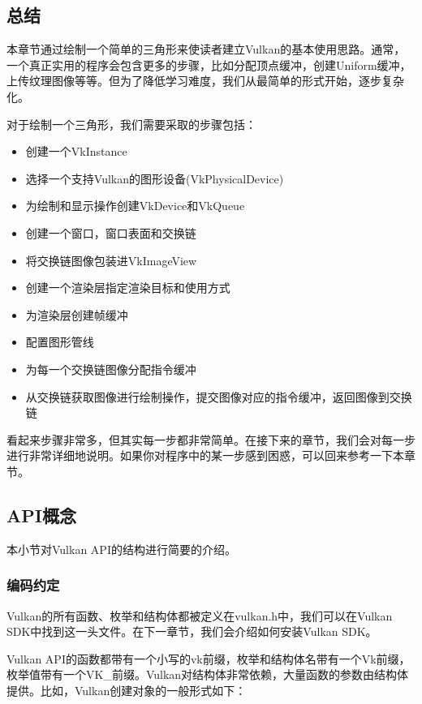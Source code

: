 \documentclass{ctexart}
\begin{document}
\subsection{总结}

本章节通过绘制一个简单的三角形来使读者建立Vulkan的基本使用思路。通常，一个真正实用的程序会包含更多的步骤，比如分配顶点缓冲，创建Uniform缓冲，上传纹理图像等等。但为了降低学习难度，我们从最简单的形式开始，逐步复杂化。

对于绘制一个三角形，我们需要采取的步骤包括：

\begin{itemize}
	\item 创建一个VkInstance
	\item 选择一个支持Vulkan的图形设备(VkPhysicalDevice)
	\item 为绘制和显示操作创建VkDevice和VkQueue
	\item 创建一个窗口，窗口表面和交换链
	\item 将交换链图像包装进VkImageView
	\item 创建一个渲染层指定渲染目标和使用方式
	\item 为渲染层创建帧缓冲
	\item 配置图形管线
	\item 为每一个交换链图像分配指令缓冲
	\item 从交换链获取图像进行绘制操作，提交图像对应的指令缓冲，返回图像到交换链
\end{itemize}

看起来步骤非常多，但其实每一步都非常简单。在接下来的章节，我们会对每一步进行非常详细地说明。如果你对程序中的某一步感到困惑，可以回来参考一下本章节。

\subsection{API概念}

本小节对Vulkan API的结构进行简要的介绍。

\subsubsection{编码约定}

Vulkan的所有函数、枚举和结构体都被定义在vulkan.h中，我们可以在Vulkan SDK中找到这一头文件。在下一章节，我们会介绍如何安装Vulkan SDK。

Vulkan API的函数都带有一个小写的vk前缀，枚举和结构体名带有一个Vk前缀，枚举值带有一个VK\_前缀。Vulkan对结构体非常依赖，大量函数的参数由结构体提供。比如，Vulkan创建对象的一般形式如下：
\end{document}
